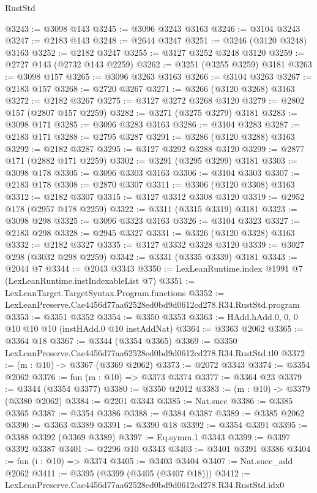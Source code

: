 \begin{lexlean}{RustStd}
\begin{coremodule}
@3243 := @3098 @143
@3245 := @3096 @3243 @3163
@3246 := @3104 @3243
@3247 := @2183 @143
@3248 := @2644 @3247
@3251 := @3246 (@3120 @3248) @3163
@3252 := @2182 @3247
@3255 := @3127 @3252 @3248 @3120
@3259 := @2727 @143 (@2732 @143 @2259)
@3262 := @3251 (@3255 @3259) @3181
@3263 := @3098 @157
@3265 := @3096 @3263 @3163
@3266 := @3104 @3263
@3267 := @2183 @157
@3268 := @2720 @3267
@3271 := @3266 (@3120 @3268) @3163
@3272 := @2182 @3267
@3275 := @3127 @3272 @3268 @3120
@3279 := @2802 @157 (@2807 @157 @2259)
@3282 := @3271 (@3275 @3279) @3181
@3283 := @3098 @171
@3285 := @3096 @3283 @3163
@3286 := @3104 @3283
@3287 := @2183 @171
@3288 := @2795 @3287
@3291 := @3286 (@3120 @3288) @3163
@3292 := @2182 @3287
@3295 := @3127 @3292 @3288 @3120
@3299 := @2877 @171 (@2882 @171 @2259)
@3302 := @3291 (@3295 @3299) @3181
@3303 := @3098 @178
@3305 := @3096 @3303 @3163
@3306 := @3104 @3303
@3307 := @2183 @178
@3308 := @2870 @3307
@3311 := @3306 (@3120 @3308) @3163
@3312 := @2182 @3307
@3315 := @3127 @3312 @3308 @3120
@3319 := @2952 @178 (@2957 @178 @2259)
@3322 := @3311 (@3315 @3319) @3181
@3323 := @3098 @298
@3325 := @3096 @3323 @3163
@3326 := @3104 @3323
@3327 := @2183 @298
@3328 := @2945 @3327
@3331 := @3326 (@3120 @3328) @3163
@3332 := @2182 @3327
@3335 := @3127 @3332 @3328 @3120
@3339 := @3027 @298 (@3032 @298 @2259)
@3342 := @3331 (@3335 @3339) @3181
@3343 := @2044 @7
@3344 := @2043 @3343
@3350 := LexLeanRuntime.index @1991 @7 (LexLeanRuntime.instIndexableList @7)
@3351 := LexLeanTarget.TargetSyntax.Program.functions
@3352 := LexLeanPreserve.Cae4456d77aa62528ed0bd9d0612cd278.R34.RustStd.program
@3353 := @3351 @3352
@3354 := @3350 @3353
@3363 := HAdd.hAdd.{0, 0, 0} @10 @10 @10 (instHAdd.{0} @10 instAddNat)
@3364 := @3363 @2062
@3365 := @3364 @18
@3367 := @3344 (@3354 @3365)
@3369 := @3350 LexLeanPreserve.Cae4456d77aa62528ed0bd9d0612cd278.R34.RustStd.tl0
@3372 := (m : @10) -> @3367 (@3369 @2062)
@3373 := @2072 @3343
@3374 := @3354 @2062
@3376 := fun (m : @10) => @3373 @3374
@3377 := @3364 @23
@3379 := @3344 (@3354 @3377)
@3380 := @3350 @2012
@3383 := (m : @10) -> @3379 (@3380 @2062)
@3384 := @2201 @3343
@3385 := Nat.succ
@3386 := @3385 @3365
@3387 := @3354 @3386
@3388 := @3384 @3387
@3389 := @3385 @2062
@3390 := @3363 @3389
@3391 := @3390 @18
@3392 := @3354 @3391
@3395 := @3388 @3392 (@3369 @3389)
@3397 := Eq.symm.{1} @3343
@3399 := @3397 @3392 @3387
@3401 := @2296 @10 @3343
@3403 := @3401 @3391 @3386
@3404 := fun (i : @10) => @3374
@3405 := @3403 @3404
@3407 := Nat.succ_add @2062
@3411 := @3395 (@3399 (@3405 (@3407 @18)))
@3412 := LexLeanPreserve.Cae4456d77aa62528ed0bd9d0612cd278.R34.RustStd.idx0

\end{coremodule}
\end{lexlean}

